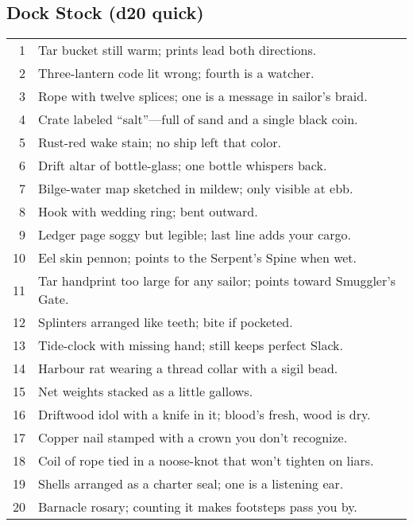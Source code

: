 \subsection*{Dock Stock (d20 quick)}
\begin{tabular}{r l}
1 & Tar bucket still warm; prints lead both directions. \\
2 & Three-lantern code lit wrong; fourth is a watcher. \\
3 & Rope with twelve splices; one is a message in sailor’s braid. \\
4 & Crate labeled “salt”—full of sand and a single black coin. \\
5 & Rust-red wake stain; no ship left that color. \\
6 & Drift altar of bottle-glass; one bottle whispers back. \\
7 & Bilge-water map sketched in mildew; only visible at ebb. \\
8 & Hook with wedding ring; bent outward. \\
9 & Ledger page soggy but legible; last line adds your cargo. \\
10 & Eel skin pennon; points to the Serpent’s Spine when wet. \\
11 & Tar handprint too large for any sailor; points toward Smuggler’s Gate. \\
12 & Splinters arranged like teeth; bite if pocketed. \\
13 & Tide-clock with missing hand; still keeps perfect Slack. \\
14 & Harbour rat wearing a thread collar with a sigil bead. \\
15 & Net weights stacked as a little gallows. \\
16 & Driftwood idol with a knife in it; blood’s fresh, wood is dry. \\
17 & Copper nail stamped with a crown you don’t recognize. \\
18 & Coil of rope tied in a noose-knot that won’t tighten on liars. \\
19 & Shells arranged as a charter seal; one is a listening ear. \\
20 & Barnacle rosary; counting it makes footsteps pass you by. \\
\end{tabular}

